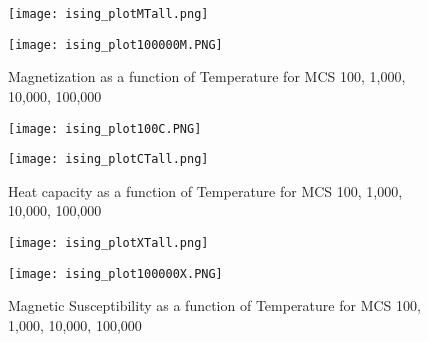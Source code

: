 \documentclass[12pt]{article}
\begin{document}
\begin{figure}[h]
\texttt{[image: ising\_plotMTall.png]} 
\label{magnetization_results}
\end{figure}

\begin{figure}[h]
\texttt{[image: ising\_plot100000M.PNG]} 
\caption{ Magnetization as a function of Temperature for MCS 100, 1,000, 10,000, 100,000 }
\label{magnetization_results}
\end{figure}

\begin{figure}[h]
\texttt{[image: ising\_plot100C.PNG]} 
\label{heatcapacity_results}
\end{figure}

\begin{figure}[h]
\texttt{[image: ising\_plotCTall.png]} 
\caption{ Heat capacity as a function of Temperature for MCS 100, 1,000, 10,000, 100,000 }
\label{heatcapacity_results}
\end{figure}

\begin{figure}[h]
\texttt{[image: ising\_plotXTall.png]} 
\label{magnetization_results}
\end{figure}

\begin{figure}[h]
\texttt{[image: ising\_plot100000X.PNG]} 
\caption{ Magnetic Susceptibility as a function of Temperature for MCS 100, 1,000, 10,000, 100,000 }
\label{magnetization_results}
\end{figure}
\end{document}
